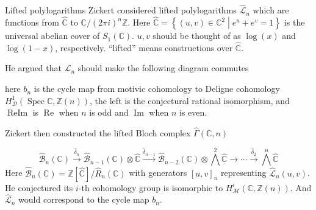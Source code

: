 \documentclass[8pt]{beamer}
\DeclareMathOperator{\Spec}{Spec}
\theoremstyle{definition}
\theoremstyle{remark}
\begin{document}
\begin{frame}[t]{Lifted polylogarithms}
Zickert considered lifted polylogarithms $\widehat{\mathcal L}_n$ which are functions from $\widehat{\mathbb C}$ to $\mathbb C/(2\pi i)^n\mathbb Z$. Here $\widehat{\mathbb C}=\left\{(u,v)\in\mathbb C^2\middle|e^u+e^v=1\right\}$ is the universal abelian cover of $S_1(\mathbb C)$. $u,v$ should be thought of as $\log(x)$ and $\log(1-x)$, respectively. ``lifted'' means constructions over $\widehat{\mathbb C}$. 
\vspace{10pt}

He argued that $\mathcal L_n$ should make the following diagram commutes
\begin{center}
\end{center}
here $b_n$ is the cycle map from motivic cohomology to Deligne cohomology $H^1_{\mathcal D}(\Spec\mathbb C,\mathbb Z(n))$, the left is the conjectural rational isomorphism, and $\operatorname{ReIm}$ is $\operatorname{Re}$ when $n$ is odd and $\operatorname{Im}$ when $n$ is even.
\vspace{10pt}

Zickert then constructed the lifted Bloch complex $\widehat\Gamma(\mathbb C,n)$

\begin{equation}\label{eq: lifted Bloch complex for C}
\widehat{\mathcal B}_n(\mathbb C)\xrightarrow{\widehat\delta_n}\widehat{\mathcal B}_{n-1}(\mathbb C)\otimes\widehat{\mathbb C}\xrightarrow{\widehat\delta_{n-1}}\widehat{\mathcal B}_{n-2}(\mathbb C)\otimes\textstyle\bigwedge^2\widehat{\mathbb C}\to\cdots\xrightarrow{\widehat\delta_2}\textstyle\bigwedge^n\widehat{\mathbb C}
\end{equation}
Here $\widehat{\mathcal B}_n(\mathbb C)=\mathbb Z[\widehat{\mathbb C}]/\widehat R_n(\mathbb C)$ with generators $[u,v]_n$ representing $\widehat{\mathcal L}_n(u,v)$. He conjectured its $i$-th cohomology group is isomorphic to $H^i_{\mathcal M}(\mathbb C,\mathbb Z(n))$. And $\widehat{\mathcal L}_n$ would correspond to the cycle map $b_n$.
\end{frame}
\end{document}
